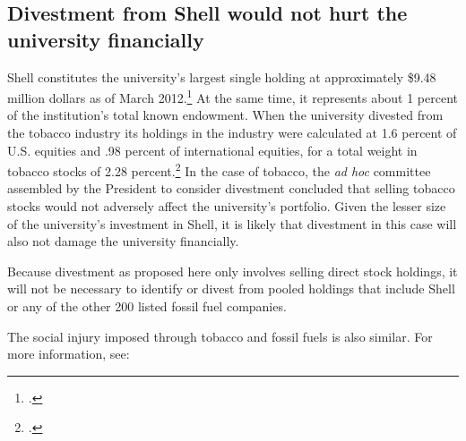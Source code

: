 	\subsection{Divestment from Shell would not hurt the university financially}
	\label{sec:ShellNotFinancialHurt}



Shell constitutes the university's largest single holding at approximately \$9.48 million dollars as of March 2012.\footcite[][]{UTAM_2012}  
At the same time, it represents about 1 percent of the institution's total known endowment.
When the university divested from the tobacco industry its holdings in the industry were calculated at 1.6 percent of U.S. equities and .98 percent of international equities, for a total weight in tobacco stocks of 2.28 percent.\footcite[][]{TobaccoReport_2007}
In the case of tobacco, the \emph{ad hoc} committee assembled by the President to consider divestment concluded that selling tobacco stocks  would not adversely affect the university's portfolio. 
Given the lesser size of the university's investment in Shell, it is likely that divestment in this case will also not damage the university financially.



Because divestment as proposed here only involves selling direct stock holdings, it will not be necessary to identify or divest from pooled holdings that include Shell or any of the other 200 listed fossil fuel companies.



The social injury imposed through tobacco and fossil fuels is also similar. 
For more information, see: 



